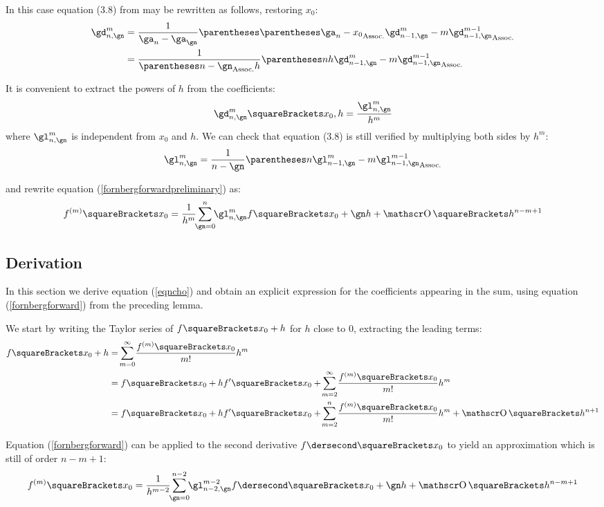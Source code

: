 \documentclass[10pt, a4paper, twoside]{basestyle}
\begin{document}
In this case equation (3.8) from \cite{Fornberg1987} may be rewritten as follows, restoring $x_0$:
\begin{align*}
\gd^{m}_{n,\gn} &= \frac{1}{\ga_n - \ga_\gn}\pa{\pa{\ga_n - x_0} \gd^{m}_{n - 1,\gn} - m \gd^{m - 1}_{n - 1,\gn}}\\
&= \frac{1}{\pa{n - \gn} h} \pa{n h \gd^{m}_{n - 1,\gn} - m \gd^{m - 1}_{n - 1,\gn}}
\end{align*}

It is convenient to extract the powers of $h$ from the coefficients:
\[
\gd^{m}_{n,\gn}\of{x_0, h} = \frac{\gl^{m}_{n,\gn}}{h^m}
\]
where $\gl^{m}_{n,\gn}$ is independent from $x_0$ and $h$.  We can check that equation (3.8) is still verified by multiplying both sides by $h^m$:
\[
\gl^{m}_{n,\gn} = \frac{1}{n - \gn} \pa{n \gl^{m}_{n - 1,\gn} - m \gl^{m - 1}_{n - 1,\gn}}
\]

and rewrite equation (\ref{fornbergforwardpreliminary}) as:
\begin{equation}
f^{(m)}\of{x_0} = \frac{1}{h^m} \sum{\gn = 0}[n]{\gl^{m}_{n,\gn} f\of{x_0 + \gn h}} + \BigO\of{h^{n - m + 1}}
\label{fornbergforward}
\end{equation}


\subsection*{Derivation}
In this section we derive equation (\ref{eqncho}) and obtain an explicit expression for the coefficients appearing in the sum, using equation (\ref{fornbergforward}) from the preceding lemma.

We start by writing the Taylor series of $f\of{x_0 + h}$ for $h$ close to $0$, extracting the leading terms:
\begin{align}
f\of{x_0 + h} &= \sum{m = 0}[\infty]{\frac{f^{(m)}\of{x_0}}{\Factorial{m}} h^m} \nonumber \\
&=f\of{x_0} + h f\der\of{x_0} + \sum{m = 2}[\infty]{\frac{f^{(m)}\of{x_0}}{\Factorial{m}} h^m} \nonumber \\
&=f\of{x_0} + h f\der\of{x_0} + \sum{m = 2}[n]{\frac{f^{(m)}\of{x_0}}{\Factorial{m}} h^m} + \BigO\of{h^{n+1}} \label{eqntaylor}
\end{align}

Equation (\ref{fornbergforward}) can be applied to the second derivative $f\dersecond\of{x_0}$ to yield an approximation which is still of order $n - m + 1$:
\[
f^{(m)}\of{x_0} = \frac{1}{h^{m - 2}} \sum{\gn = 0}[n - 2]{\gl^{m - 2}_{n - 2,\gn} f\dersecond\of{x_0 + \gn h}} + \BigO\of{h^{n - m + 1}}
\]
\end{document}
